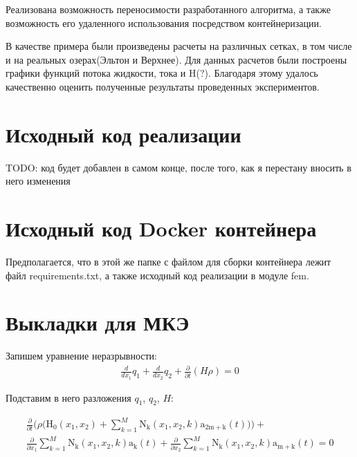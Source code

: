 \documentclass[14pt]{extreport}
\begin{document}
Реализована возможность переносимости разработанного алгоритма, а также возможность его удаленного использования посредством контейнеризации.

В качестве примера были произведены расчеты на различных сетках, в том числе и на реальных озерах(Эльтон и Верхнее). Для данных расчетов были построены графики функций потока жидкости, тока и H(?). Благодаря этому удалось качественно оценить полученные результаты проведенных экспериментов.




\Appendix

\chapter{Исходный код реализации}
TODO: код будет добавлен в самом конце, после того, как я перестану вносить в него изменения

\chapter{Исходный код Docker контейнера}

Предполагается, что в этой же папке с файлом для сборки контейнера лежит файл requirements.txt, а также исходный код реализации в модуле fem.

\begin{minipage}{\linewidth}

\end{minipage}

\begin{minipage}{\linewidth}

\end{minipage}
 
\chapter{Выкладки для МКЭ}

Запишем уравнение неразрывности:
\begin{eqnarray}
\frac{d}{d x_{1}} q_{1} + \frac{d}{d x_{2}} q_{2} + \frac{\partial}{\partial t}\left(H \rho\right) = 0
\end{eqnarray}


Подставим в него разложения $q_1$, $q_2$, $H$:

\begin{multline*}
\frac{\partial}{\partial t}\bigg(\rho \bigg(\operatorname{H_{0}}{ (x_{1},x_{2}  )}+ \sum_{k=1}^{M} \operatorname{N_{k}}{ (x_{1},x_{2},k  )} \operatorname{a_{2m+k}}{ (t  )}\bigg)\bigg) + \\\frac{\partial}{\partial x_{1}} \sum_{k=1}^{M} \operatorname{N_{k}}{ (x_{1},x_{2},k  )} \operatorname{a_{k}}{ (t  )} + \frac{\partial}{\partial x_{2}} \sum_{k=1}^{M} \operatorname{N_{k}}{ (x_{1},x_{2},k  )} \operatorname{a_{m+k}}{ (t  )} = 0
\end{multline*}
\end{document}
